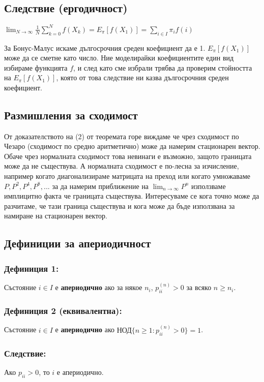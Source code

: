 \documentclass{article}
\begin{document}
\subsection{Следствие (ергодичност)}
$\lim_{N\to\infty} \frac{1}{N}\sum_{k=0}^N f(X_k) = E_\pi[f(X_1)] = \sum_{i \in I} \pi_i f(i)$

За Бонус-Малус искаме дългосрочния среден коефициент да е 1. $E_\pi[f(X_1)]$ може да се сметне като число. 
Ние моделирайки коефициентите един вид избираме функцията $f$, и след като сме избрали трябва да проверим 
стойността на $E_\pi[f(X_1)]$, която от това следствие ни казва дългосрочния среден коефициент.

\subsection{Размишления за сходимост}
От доказателството на (2) от теоремата горе виждаме че чрез сходимост по Чезаро (сходимост 
по средно аритметично) може да намерим стационарен вектор. Обаче чрез нормалната сходимост това невинаги е възможно, 
защото границата може да не съществува. А нормалната сходимост е по-лесна за изчисление, например когато 
диагонализираме матрицата на преход или когато умножаваме $P, P^2, P^4, P^8,...$ за да намерим приближение на $\lim_{n\to\infty}P^n$ използваме имплицитно факта че границата съществува. Интересуваме се кога точно може да разчитаме, че тази граница съществува и кога може да бъде използвана за намиране на стационарен вектор.

\subsection{Дефиниции за апериодичност}
\subsubsection*{Дефиниция 1:}
Състояние $i \in I$ е \textbf{апериодично} ако за някое $n_i$, $p_{ii}^{(n)} > 0$ за всяко $n \geq n_i$.

\subsubsection*{Дефиниция 2 (еквивалентна):}
Състояние $i \in I$ е \textbf{апериодично} ако $\text{НОД}\{n \geq 1 : p_{ii}^{(n)} > 0\} = 1$.

\subsubsection*{Следствие:}
Ако $p_{ii} > 0$, то $i$ е апериодично.
\end{document}
